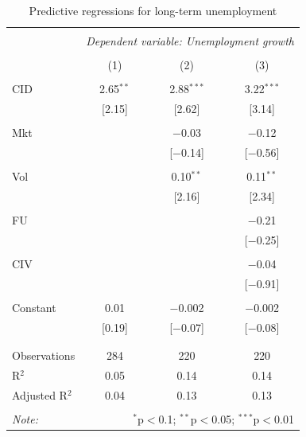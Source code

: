 \documentclass[12pt]{article}
\begin{document}
\begin{table}[!htbp] \centering 
  \caption{Predictive regressions for long-term unemployment} 
  \label{} 
\begin{tabular}{@{\extracolsep{5pt}}lccc} 
\\[-1.8ex]\hline 
\hline \\[-1.8ex] 
 & \multicolumn{3}{c}{\textit{Dependent variable: Unemployment growth}} \\ 
\cline{2-4} 
\\[-1.8ex] & (1) & (2) & (3)\\ 
\hline \\[-1.8ex] 
 CID & 2.65$^{**}$ & 2.88$^{***}$ & 3.22$^{***}$ \\ 
  & [2.15] & [2.62] & [3.14] \\ 
  & & & \\ 
 Mkt &  & $-$0.03 & $-$0.12 \\ 
  &  & [$-$0.14] & [$-$0.56] \\ 
  & & & \\ 
 Vol &  & 0.10$^{**}$ & 0.11$^{**}$ \\ 
  &  & [2.16] & [2.34] \\ 
  & & & \\ 
 FU &  &  & $-$0.21 \\ 
  &  &  & [$-$0.25] \\ 
  & & & \\ 
 CIV &  &  & $-$0.04 \\ 
  &  &  & [$-$0.91] \\ 
  & & & \\ 
 Constant & 0.01 & $-$0.002 & $-$0.002 \\ 
  & [0.19] & [$-$0.07] & [$-$0.08] \\ 
  & & & \\ 
\hline \\[-1.8ex] 
Observations & 284 & 220 & 220 \\ 
R$^{2}$ & 0.05 & 0.14 & 0.14 \\ 
Adjusted R$^{2}$ & 0.04 & 0.13 & 0.13 \\ 
\hline 
\hline \\[-1.8ex] 
\textit{Note:}  & \multicolumn{3}{r}{$^{*}$p$<$0.1; $^{**}$p$<$0.05; $^{***}$p$<$0.01} \\ 
\end{tabular} 
\end{table} 
\end{document}
